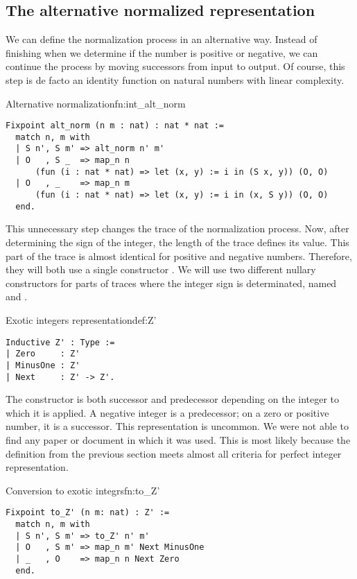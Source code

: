 \subsection{The alternative normalized representation}
We can define the normalization process in an alternative way. Instead of finishing when we determine if the number is positive or negative, we can continue the process by moving successors from input to output. Of course, this step is de facto an identity function on natural numbers with linear complexity.
\pagebreak
\begin{func}{Alternative normalization}{fn:int_alt_norm}

\begin{verbatim}
Fixpoint alt_norm (n m : nat) : nat * nat :=
  match n, m with
  | S n', S m' => alt_norm n' m'
  | O   , S _  => map_n n 
      (fun (i : nat * nat) => let (x, y) := i in (S x, y)) (O, O)
  | O   , _    => map_n m 
      (fun (i : nat * nat) => let (x, y) := i in (x, S y)) (O, O)
  end.
\end{verbatim}
\end{func}
This unnecessary step changes the trace of the normalization process. Now, after determining the sign of the integer, the length of the trace defines its value. This part of the trace is almost identical for positive and negative numbers. Therefore, they will both use a single constructor . We will use two different nullary constructors for parts of traces where the integer sign is determinated, named  and .
\begin{defi}{Exotic integers representation}{def:Z'}
\begin{verbatim}
Inductive Z' : Type :=
| Zero     : Z'
| MinusOne : Z'
| Next     : Z' -> Z'.
\end{verbatim}
\end{defi}
The  constructor is both successor and predecessor depending on the integer to which it is applied. A negative integer is a predecessor; on a zero or positive number, it is a successor. This representation is uncommon. We were not able to find any paper or document in which it was used. This is most likely because the definition from the previous section meets almost all criteria for perfect integer representation.
\begin{func}{Conversion to exotic integrs}{fn:to_Z'}
\begin{verbatim}
Fixpoint to_Z' (n m: nat) : Z' :=
  match n, m with
  | S n', S m' => to_Z' n' m'
  | O   , S m' => map_n m' Next MinusOne
  | _   , O    => map_n n Next Zero
  end.
\end{verbatim}
\end{func}
